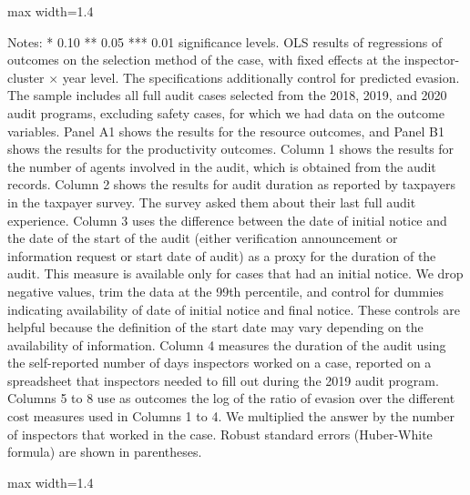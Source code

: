 \documentclass{article}
\begin{document}
\begin{landscape}
\begin{table}[H]
\begin{adjustbox}{max width=1.4\textwidth}
\begin{threeparttable}
\begin{tablenotes}[flushleft]
\footnotesize
\item Notes: * 0.10 ** 0.05 *** 0.01 significance levels. OLS results of regressions of outcomes on the selection method of the case, with fixed effects at the inspector-cluster $\times$ year level. The specifications additionally control for predicted evasion. The sample includes all full audit cases selected from the 2018, 2019, and 2020 audit programs, excluding safety cases, for which we had data on the outcome variables. Panel A1 shows the results for the resource outcomes, and Panel B1 shows the results for the productivity outcomes. Column 1 shows the results for the number of agents involved in the audit, which is obtained from the audit records. Column 2 shows the results for audit duration as reported by taxpayers in the taxpayer survey. The survey asked them about their last full audit experience. Column 3 uses the difference between the date of initial notice and the date of the start of the audit (either verification announcement or information request or start date of audit) as a proxy for the duration of the audit. This measure is available only for cases that had an initial notice. We drop negative values, trim the data at the 99th percentile, and control for dummies indicating availability of date of initial notice and final notice. These controls are helpful because the definition of the start date may vary depending on the availability of information. Column 4 measures the duration of the audit using the self-reported number of days inspectors worked on a case, reported on a spreadsheet that inspectors needed to fill out during the 2019 audit program. Columns 5 to 8 use as outcomes the log of the ratio of evasion over the different cost measures used in Columns 1 to 4. We multiplied the answer by the number of inspectors that worked in the case. Robust standard errors (Huber-White formula) are shown in parentheses.
\end{tablenotes}
\end{threeparttable}
\end{adjustbox}
\end{table}

\begin{table}[H]\centering
\begin{adjustbox}{max width=1.4\textwidth}
\begin{threeparttable}
\caption{Resources Allocated to Audits and Audit Productivity, Full Audits, with Predicted Evasion Quadratic Control (Panels A1 and B1 only)}
\label{tab:table5_fullaudits_yhatrf_quadratic_control}


\end{threeparttable}
\end{adjustbox}
\end{table}
\end{landscape}
\end{document}
